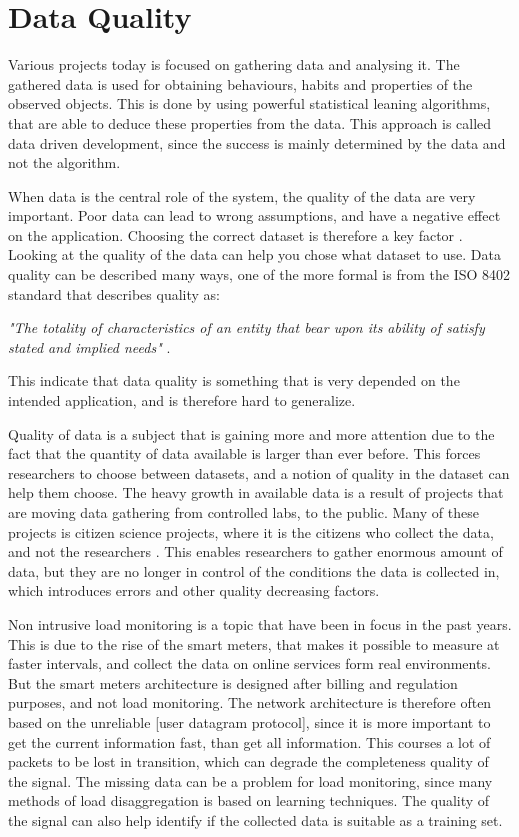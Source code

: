 \chapter{Data Quality}
\label{Sec:DataQuality}
Various projects today is focused on gathering data and analysing it. The gathered data is used for obtaining behaviours, habits and properties of the observed objects. This is done by using powerful statistical leaning algorithms, that are able to deduce these properties from the data. This approach is called data driven development, since the success is mainly determined by the data and not the algorithm. 

When data is the central role of the system, the quality of the data are very important. Poor data can lead to wrong assumptions, and have a negative effect on the application. Choosing the correct dataset is therefore a key factor \cite{RefWorks:3}. Looking at the quality of the data can help you chose what dataset to use. Data quality can be described many ways, one of the more formal is from the ISO 8402 standard that describes quality as: 

\begin{adjustwidth}{2.5em}{2.5em}
\emph{"The totality of characteristics of an entity that bear upon its ability of satisfy stated and implied needs"} \cite{RefWorks:5}.
\end{adjustwidth}

This indicate that data quality is something that is very depended on the intended application, and is therefore hard to generalize. 

Quality of data is a subject that is gaining more and more attention due to the fact that the quantity of data available is larger than ever before. This forces researchers to choose between datasets, and a notion of quality in the dataset can help them choose. The heavy growth in available data is a result of projects that are moving data gathering from controlled labs, to the public. Many of these projects is citizen science projects, where it is the citizens who collect the data, and not the researchers \cite{RefWorks:2}. This enables researchers to gather enormous amount of data, but they are no longer in control of the conditions the data is collected in, which introduces errors and other quality decreasing factors. 

Non intrusive load monitoring is a topic that have been in focus in the past years. This is due to the rise of the smart meters, that makes it possible to measure at faster intervals, and collect the data on online services form real environments. But the smart meters architecture is designed after billing and regulation purposes, and not load monitoring. The network architecture is therefore often based on the unreliable [user datagram protocol], since it is more important to get the current information fast, than get all information. This courses a lot of packets to be lost in transition, which can degrade the completeness quality of the signal. The missing data can be a problem for load monitoring, since many methods of load disaggregation is based on learning techniques. The quality of the signal can also help identify if the collected data is suitable as a training set. 


